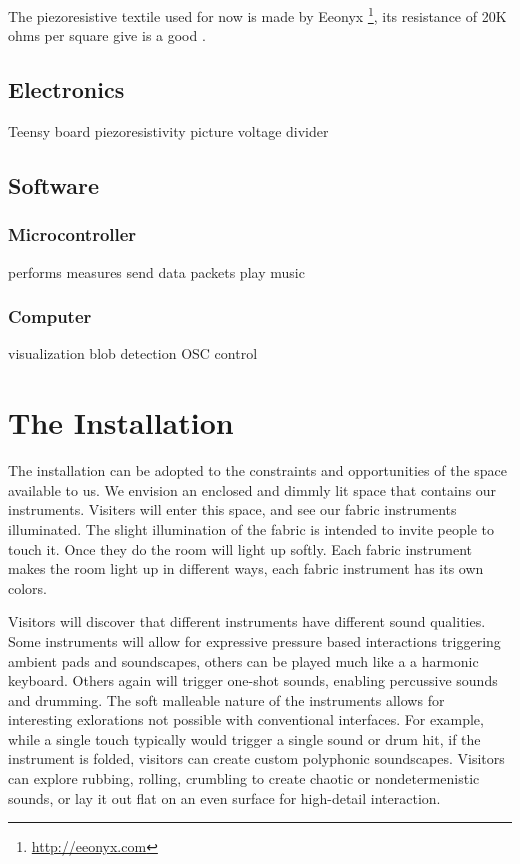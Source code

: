 \documentclass{sigchi-ext}
\begin{document}
The piezoresistive textile used for now is made by Eeonyx \footnote{\url{http://eeonyx.com}}, its resistance of 20K ohms per square give is a good .


\subsection{Electronics}

Teensy board
piezoresistivity picture
voltage divider


\subsection{Software}

\subsubsection{Microcontroller}

performs measures
send data packets
play music

\subsubsection{Computer}

visualization
blob detection
OSC control






\section{The Installation}
The installation can be adopted to the constraints and opportunities of the space available to us. We envision an enclosed and dimmly lit space that contains our instruments.  Visiters will enter this space, and see our fabric instruments illuminated. The slight illumination of the fabric is intended to invite people to touch it. Once they do the room will light up softly. Each fabric instrument makes the room light up in different ways, each fabric instrument has its own colors.

Visitors will discover that different instruments have different sound qualities. Some instruments will allow for expressive pressure based interactions triggering ambient pads and soundscapes, others can be played much like a a harmonic keyboard. Others again will trigger one-shot sounds, enabling percussive sounds and drumming. The soft malleable nature of the instruments allows for interesting exlorations not possible with conventional interfaces. For example, while a single touch typically would trigger a single sound or drum hit, if the instrument is folded, visitors can create custom polyphonic soundscapes.  Visitors can explore rubbing, rolling, crumbling to create chaotic or nondetermenistic sounds, or lay it out flat on an even surface for high-detail interaction.
\end{document}
